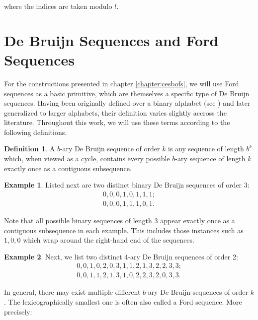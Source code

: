 \documentclass[11pt,a4paper]{tesis}
\theoremstyle{plain}
\theoremstyle{definition}
\newtheorem*{definition*}{Definition}
\newtheorem*{exmp*}{Example}
\begin{document}
where the indices are taken modulo $l$.

\section{De Bruijn Sequences and Ford Sequences}

For the constructions presented in chapter \ref{chapter:cesbofs}, we will use Ford sequences as a basic primitive, which are themselves a specific type of De Bruijn sequences. Having been originally defined over a binary alphabet (see \cite{de-bruijn-1946}) and later generalized to larger alphabets, their definition varies slightly accross the literature. Throughout this work, we will use these terms according to the following definitions.

\begin{definition*}
  A $b$-ary De Bruijn sequence of order $k$ is any sequence of length $b^k$ which, when viewed as a cycle, contains every possible $b$-ary sequence of length $k$ exactly once as a contiguous subsequence.
\end{definition*}

\begin{exmp*}
  Listed next are two distinct binary De Bruijn sequences of order 3:
  \begin{equation*}
    \begin{aligned}
      0, 0, 0, 1, 0, 1, 1, 1; \\
      0, 0, 0, 1, 1, 1, 0, 1.
    \end{aligned}
  \end{equation*}
\end{exmp*}

Note that all possible binary sequences of length 3 appear exactly once as a contiguous subsequence in each example. This includes those instances such as $1, 0, 0$ which wrap around the right-hand end of the sequences.

\begin{exmp*}
  Next, we list two distinct 4-ary De Bruijn sequences of order 2:
  \begin{equation*}
    \begin{aligned}
      0, 0, 1, 0, 2, 0, 3, 1, 1, 2, 1, 3, 2, 2, 3, 3; \\
      0, 0, 1, 1, 2, 1, 3, 1, 0, 2, 2, 3, 2, 0, 3, 3.
    \end{aligned}
  \end{equation*}  
\end{exmp*}

In general, there may exist multiple different $b$-ary De Bruijn sequences of order $k$. The lexicographically smallest one is often also called a Ford sequence. More precisely:
\end{document}
